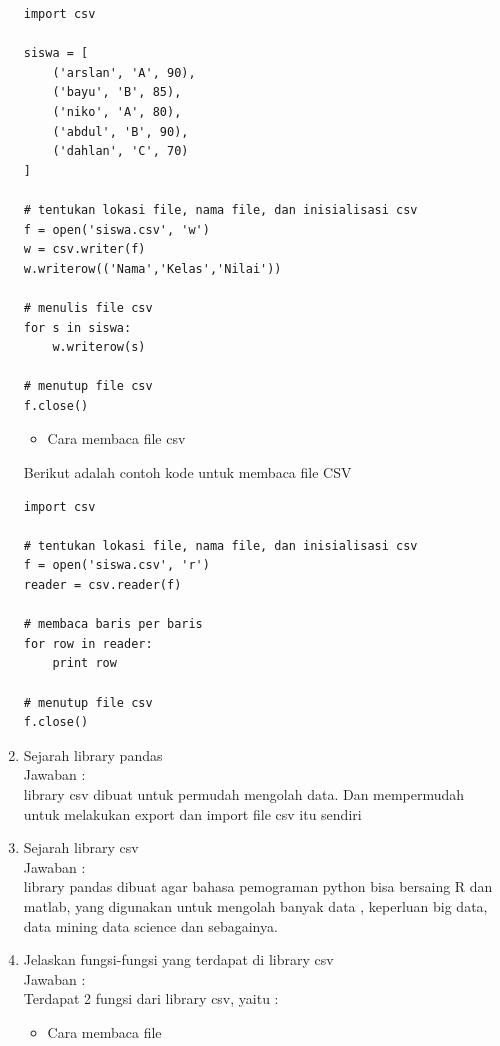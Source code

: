\begin{enumerate}
\begin{verbatim}
import csv

siswa = [
    ('arslan', 'A', 90),
    ('bayu', 'B', 85),
    ('niko', 'A', 80),
    ('abdul', 'B', 90),
    ('dahlan', 'C', 70)
]

# tentukan lokasi file, nama file, dan inisialisasi csv
f = open('siswa.csv', 'w')
w = csv.writer(f)
w.writerow(('Nama','Kelas','Nilai'))

# menulis file csv
for s in siswa:
    w.writerow(s)

# menutup file csv
f.close()
\end{verbatim}

\begin{itemize}
\item Cara membaca file csv
\end{itemize}

Berikut adalah contoh kode untuk membaca file CSV 

\begin{verbatim}
import csv

# tentukan lokasi file, nama file, dan inisialisasi csv
f = open('siswa.csv', 'r')
reader = csv.reader(f)

# membaca baris per baris
for row in reader:
    print row

# menutup file csv
f.close()
\end{verbatim}

\item Sejarah library pandas\\
Jawaban :\\
library csv dibuat untuk permudah mengolah data. Dan mempermudah untuk melakukan export dan import file csv itu sendiri


\item Sejarah library csv\\
Jawaban :\\
 library pandas dibuat agar bahasa pemograman python bisa bersaing R dan matlab, yang digunakan untuk mengolah banyak data , keperluan big data, data mining data science dan sebagainya.

\item Jelaskan  fungsi-fungsi yang terdapat di library csv\\
Jawaban :\\
Terdapat 2 fungsi dari library csv, yaitu :

\begin{itemize}
\item Cara membaca file
\end{itemize}


\end{enumerate}
